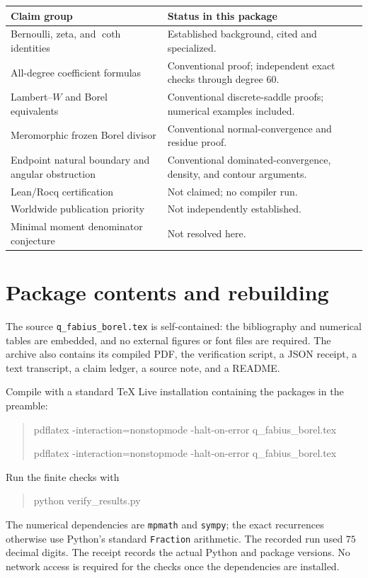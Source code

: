 \documentclass[11pt,a4paper]{article}
\numberwithin{equation}{section}
\theoremstyle{definition}
\theoremstyle{remark}
\begin{document}
\begin{center}
\begin{tabularx}{\textwidth}{@{}>{\raggedright\arraybackslash}p{}Y@{}}
\toprule
Claim group & Status in this package\\
\midrule
Bernoulli, zeta, and $\coth$ identities & Established background, cited and specialized.\\
All-degree coefficient formulas & Conventional proof; independent exact checks through degree $60$.\\
Lambert--$W$ and Borel equivalents & Conventional discrete-saddle proofs; numerical examples included.\\
Meromorphic frozen Borel divisor & Conventional normal-convergence and residue proof.\\
Endpoint natural boundary and angular obstruction & Conventional dominated-convergence, density, and contour arguments.\\
Lean/Rocq certification & Not claimed; no compiler run.\\
Worldwide publication priority & Not independently established.\\
Minimal moment denominator conjecture & Not resolved here.\\
\bottomrule
\end{tabularx}
\end{center}

\section{Package contents and rebuilding}
The source \texttt{q\_fabius\_borel.tex} is self-contained: the bibliography and numerical tables are embedded, and no external figures or font files are required. The archive also contains its compiled PDF, the verification script, a JSON receipt, a text transcript, a claim ledger, a source note, and a README.

Compile with a standard TeX Live installation containing the packages in the preamble:
\begin{quote}\small\ttfamily
pdflatex -interaction=nonstopmode -halt-on-error q\_fabius\_borel.tex\par
pdflatex -interaction=nonstopmode -halt-on-error q\_fabius\_borel.tex
\end{quote}
Run the finite checks with
\begin{quote}\small\ttfamily
python verify\_results.py
\end{quote}
The numerical dependencies are \texttt{mpmath} and \texttt{sympy}; the exact recurrences otherwise use Python's standard \texttt{Fraction} arithmetic. The recorded run used $75$ decimal digits. The receipt records the actual Python and package versions. No network access is required for the checks once the dependencies are installed.
\end{document}
